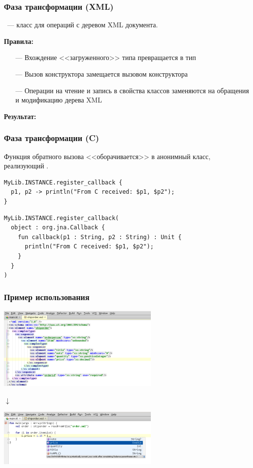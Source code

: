 \documentclass[12pt]{beamer}
\newcommand{\nl}{\vspace{\baselineskip}}
\newcommand{\darrow}{\center{\Large{$\mathbf\downarrow$}}}
\begin{document}
\begin{frame}\frametitle{Фаза трансформации (XML)}

~--- класс для операций с деревом XML документа. \nl

\textbf{Правила:}
\begin{itemize}
\item[---] Вхождение <<загруженного>> типа превращается в тип 
\item[---] Вызов конструктора замещается вызовом конструктора 
\item[---] Операции на чтение и запись в свойства классов заменяются на обращения и модификацию дерева XML
\end{itemize}

\nl

\textbf{Результат:}

\end{frame}

\begin{frame}[containsverbatim]\frametitle{Фаза трансформации (C)}

Функция обратного вызова <<оборачивается>> в анонимный класс, реализующий . \nl

\begin{lstlisting}
MyLib.INSTANCE.register_callback {
  p1, p2 -> println("From C received: $p1, $p2");
}
\end{lstlisting}

\darrow

\begin{lstlisting}
MyLib.INSTANCE.register_callback(
  object : org.jna.Callback {
    fun callback(p1 : String, p2 : String) : Unit {
      println("From C received: $p1, $p2");
    }
  }
)
\end{lstlisting}
\end{frame}

\begin{frame}\frametitle{Пример использования}
\begin{center}
    \includegraphics[height=4.132cm,width=8cm]{shiporder}

    {$\mathbf\downarrow$} %

    \includegraphics[height=2.829cm,width=8cm]{completion}
\end{center}
\end{frame}
\end{document}
